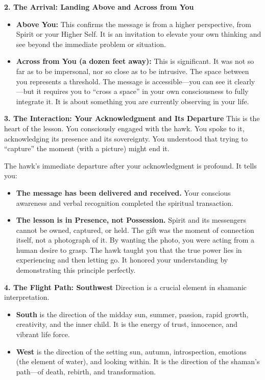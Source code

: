 \documentclass{article}
\begin{document}
\textbf{2. The Arrival: Landing Above and Across from You}

\begin{itemize}
\item
  \textbf{Above You:} This confirms the message is from a higher
  perspective, from Spirit or your Higher Self. It is an invitation to
  elevate your own thinking and see beyond the immediate problem or
  situation.
\item
  \textbf{Across from You (a dozen feet away):} This is significant. It
  was not so far as to be impersonal, nor so close as to be intrusive.
  The space between you represents a threshold. The message is
  accessible---you can see it clearly---but it requires you to ``cross a
  space'' in your own consciousness to fully integrate it. It is about
  something you are currently observing in your life.
\end{itemize}

\textbf{3. The Interaction: Your Acknowledgment and Its Departure} This
is the heart of the lesson. You consciously engaged with the hawk. You
spoke to it, acknowledging its presence and its sovereignty. You
understood that trying to ``capture'' the moment (with a picture) might
end it.

The hawk's immediate departure after your acknowledgment is profound. It
tells you:

\begin{itemize}
\item
  \textbf{The message has been delivered and received.} Your conscious
  awareness and verbal recognition completed the spiritual transaction.
\item
  \textbf{The lesson is in Presence, not Possession.} Spirit and its
  messengers cannot be owned, captured, or held. The gift was the moment
  of connection itself, not a photograph of it. By wanting the photo,
  you were acting from a human desire to grasp. The hawk taught you that
  the true power lies in experiencing and then letting go. It honored
  your understanding by demonstrating this principle perfectly.
\end{itemize}

\textbf{4. The Flight Path: Southwest} Direction is a crucial element in
shamanic interpretation.

\begin{itemize}
\item
  \textbf{South} is the direction of the midday sun, summer, passion,
  rapid growth, creativity, and the inner child. It is the energy of
  trust, innocence, and vibrant life force.
\item
  \textbf{West} is the direction of the setting sun, autumn,
  introspection, emotions (the element of water), and looking within. It
  is the direction of the shaman's path---of death, rebirth, and
  transformation.
\end{itemize}
\end{document}
